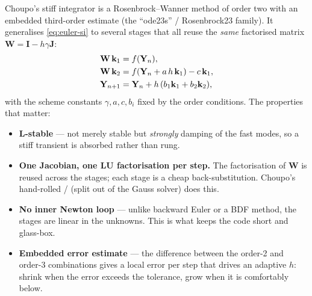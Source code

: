 \documentclass[11pt,a4paper]{article}
\newcommand{\Jac}{\mathbf{J}}
\newcommand{\Yv}{\mathbf{Y}}                          %
\begin{document}
Choupo's stiff integrator is a Rosenbrock--Wanner method of order
two with an embedded third-order estimate (the ``ode23s'' / Rosenbrock23
family).  It generalises \eqref{eq:euler-si} to several stages that
all reuse the \emph{same} factorised matrix
$\mathbf{W} = \mathbf{I} - h\gamma\Jac$:
\begin{align}
    \mathbf{W}\,\mathbf{k}_1 &= f(\Yv_n), \notag\\
    \mathbf{W}\,\mathbf{k}_2 &= f(\Yv_n + a\,h\,\mathbf{k}_1) - c\,\mathbf{k}_1, \notag\\
    \Yv_{n+1} &= \Yv_n + h\,(b_1\mathbf{k}_1 + b_2\mathbf{k}_2),
    \label{eq:ros23}
\end{align}
with the scheme constants $\gamma, a, c, b_i$ fixed by the order
conditions.  The properties that matter:
\begin{itemize}
    \item \textbf{L-stable} --- not merely stable but
    \emph{strongly} damping of the fast modes, so a stiff transient
    is absorbed rather than rung.
    \item \textbf{One Jacobian, one LU factorisation per step.}  The
    factorisation of $\mathbf{W}$ is reused across the stages; each
    stage is a cheap back-substitution.  Choupo's hand-rolled
    / (split out of the Gauss solver)
    does this.
    \item \textbf{No inner Newton loop} --- unlike backward Euler or a
    BDF method, the stages are linear in the unknowns.  This is what
    keeps the code short and glass-box.
    \item \textbf{Embedded error estimate} --- the difference between
    the order-2 and order-3 combinations gives a local error per step
    that drives an adaptive $h$: shrink when the error exceeds the
    tolerance, grow when it is comfortably below.
\end{itemize}
\end{document}
